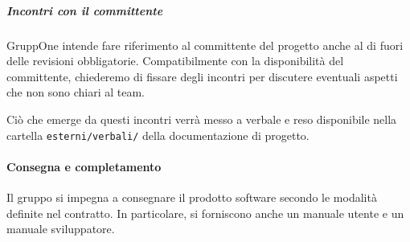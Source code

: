 \documentclass[../../norme-di-progetto.tex]{subfiles}
\begin{document}
\subparagraph{Incontri con il committente}%
\label{subp:incontri_con_il_committente}

GruppOne intende fare riferimento al committente del progetto anche al di fuori delle revisioni obbligatorie.
Compatibilmente con la disponibilità del committente, chiederemo di fissare degli incontri per discutere eventuali aspetti che non sono chiari al team.

Ciò che emerge da questi incontri verrà messo a verbale e reso disponibile nella cartella \verb|esterni/verbali/| della documentazione di progetto.

\paragraph{Consegna e completamento}%
\label{par:consegna e completamento}

Il gruppo si impegna a consegnare il prodotto software secondo le modalità definite nel contratto. In particolare, si forniscono anche un manuale utente e un manuale sviluppatore.
\end{document}
